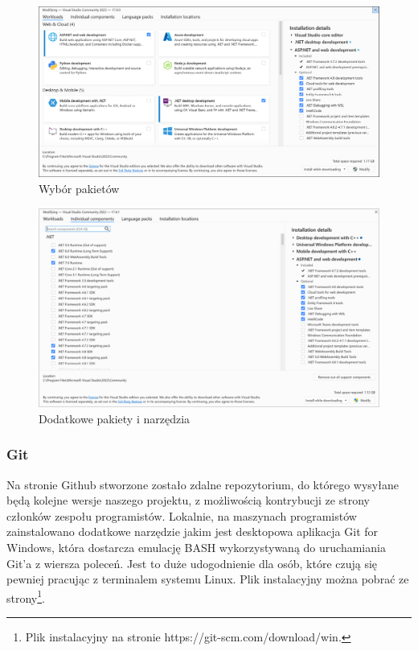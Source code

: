 \begin{figure}[!htb]
	\centering
	\includegraphics[width=0.8\linewidth]{rys/vs2.png}
	\caption{Wybór pakietów}
	\label{rys:rysunek002b}
\end{figure}

\begin{figure}[!htb]
	\centering
	\includegraphics[width=0.8\linewidth]{rys/vs3.png}
	\caption{Dodatkowe pakiety i narzędzia}
	\label{rys:rysunek002c}
\end{figure}

\subsubsection{Git} %

\hspace{0.60cm}Na stronie Github stworzone zostało zdalne repozytorium, do którego wysyłane będą kolejne wersje naszego projektu, z możliwością kontrybucji ze strony członków zespołu programistów. Lokalnie, na maszynach programistów zainstalowano dodatkowe narzędzie jakim jest desktopowa aplikacja Git for Windows, która dostarcza emulację BASH wykorzystywaną do uruchamiania Git'a z wiersza poleceń. Jest to duże udogodnienie dla osób, które czują się pewniej pracując z terminalem systemu Linux. Plik instalacyjny można pobrać ze strony\footnote{Plik instalacyjny na stronie https://git-scm.com/download/win\cite{www2}.}.

